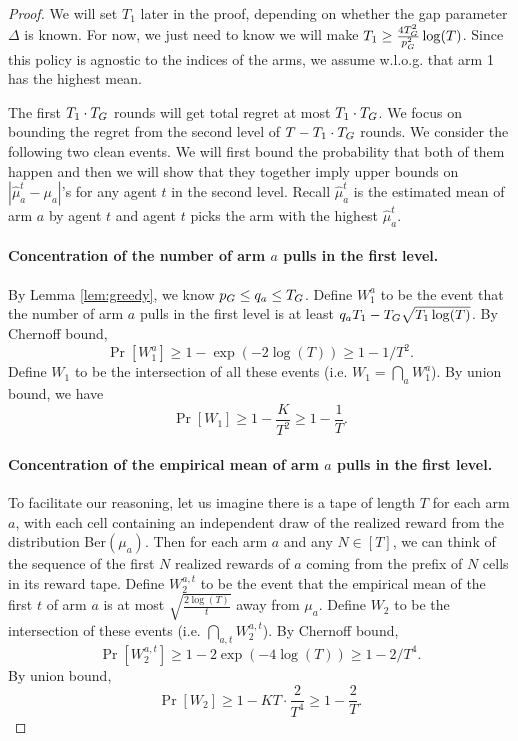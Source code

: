 





\begin{proof}
  We will set $T_1$ later in the proof, depending on whether the gap
  parameter $\Delta$ is known. For now, we just need to know we will
  make $T_1 \geq \frac{4T_G^2}{p_G^2}\log(T)$. Since this policy is
  agnostic to the indices of the arms, we assume w.l.o.g. that arm 1
  has the highest mean.

  The first $T_1 \cdot T_G$ rounds will get total regret at most
  $T_1 \cdot T_G$.  We focus on bounding the regret from the second
  level of $T - T_1 \cdot T_G$ rounds. We consider the following two
  clean events. We will first bound the probability that both of them
  happen and then we will show that they together imply upper bounds
  on $|\hat{\mu}^t_a - \mu_a|$'s for any agent $t$ in the second
  level. Recall $\hat{\mu}^t_a$ is the estimated mean of arm $a$ by
  agent $t$ and agent $t$ picks the arm with the highest
  $\hat{\mu}^t_a$.

  \paragraph{Concentration of the number of arm $a$ pulls in the first
    level.}
  By Lemma \ref{lem:greedy}, we know $p_G \leq q_a \leq T_G$. Define
  $W_1^a$ to be the event that the number of arm $a$ pulls in the
  first level is at least $q_a T_1- T_G \sqrt{T_1\log(T)}$.
    By Chernoff bound,
  \[
    \Pr[W_1^a] \geq 1-\exp(-2\log(T)) \geq 1-1/T^2.
  \]
Define $W_1$ to be the intersection of all these events (i.e. $W_1 = \bigcap_{a}W_1^a$). By union bound, we have
\[
\Pr[W_1] \geq 1- \frac{K}{T^2} \geq 1 - \frac{1}{T}.
\]
\paragraph{Concentration of the empirical mean of arm $a$ pulls in the first level.}
To facilitate our reasoning, let us imagine there is a tape of length
$T$ for each arm $a$, with each cell containing an independent draw of
the realized reward from the distribution Ber$(\mu_a)$. Then for each
arm $a$ and any $N\in [T]$, we can think of the sequence of the first
$N$ realized rewards of $a$ coming from the prefix of $N$ cells in its
reward tape. Define $W^{a,t}_2$ to be the event that the empirical
mean of the first $t$  of arm $a$
is at most $\sqrt{\frac{2\log(T)}{t}}$ away from $\mu_a$. Define $W_2$
to be the intersection of these events (i.e.
$\bigcap_{a,t} W^{a,t}_2$).  By Chernoff bound,
\[
\Pr[W^{a,t}_2] \geq 1 - 2\exp(-4\log(T)) \geq 1-2/T^4.
\]
By union bound, 
\[
\Pr[W_2] \geq 1 - KT \cdot \frac{2}{T^4} \geq 1 - \frac{2}{T}.
\]




\end{proof}

